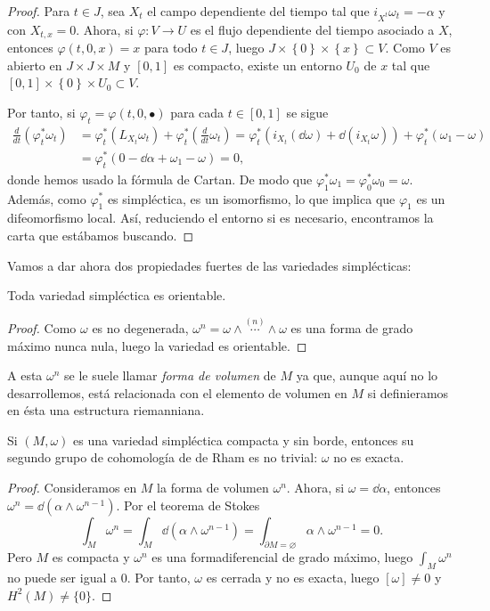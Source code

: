 \begin{proof}
  Para $t \in J$, sea $X_t$ el campo dependiente del tiempo tal que $i_{X^t}\omega_t= - \alpha$ y con $X_{t,x}=0$. Ahora, si $\varphi:V\rightarrow U$ es el flujo dependiente del tiempo asociado a $X$, entonces $\varphi(t,0,x)=x$ para todo $t\in J$, luego $J\times \left\{ 0 \right\}\times \left\{ x \right\} \subset V$. Como $V$ es abierto en $J\times J\times M$ y $[0,1]$ es compacto, existe un entorno $U_0$ de $x$  tal que $[0,1]\times \left\{ 0 \right\}\times U_0 \subset V$. 
  
  Por tanto, si $\varphi_t = \varphi(t,0,\bullet)$ para cada $t\in [0,1]$ se sigue
  \begin{align*}
    \frac{d}{dt}(\varphi_t^*\omega_t) & = \varphi_t^* (L_{X_t}\omega_t) + \varphi_t^* \left( \frac{d}{dt}\omega_t \right) = \varphi_t^* (i_{X_t}(\dd \omega)+\dd (i_{X_t}\omega))+\varphi_t^*(\omega_1-\omega) \\
    & = \varphi_t^*(0-\dd \alpha + \omega_1 - \omega) = 0,
  \end{align*}
  donde hemos usado la fórmula de Cartan. De modo que $\varphi_1^*\omega_1=\varphi_0^*\omega_0=\omega$. Además, como $\varphi_1^*$ es simpléctica, es un isomorfismo, lo que implica que $\varphi_1$ es un difeomorfismo local. Así, reduciendo el entorno si es necesario, encontramos la carta que estábamos buscando.
\end{proof}

Vamos a dar ahora dos propiedades fuertes de las variedades simplécticas:
\begin{prop}
  Toda variedad simpléctica es orientable.
\end{prop}
\begin{proof}
  Como $\omega$ es no degenerada, $\omega^n=\omega \wedge \overset{(n)}{\cdots} \wedge \omega$ es una forma de grado máximo nunca nula, luego la variedad es orientable.
\end{proof}

A esta $\omega^n$ se le suele llamar \emph{forma de volumen} de $M$ ya que, aunque aquí no lo desarrollemos, está relacionada con el elemento de volumen en $M$ si definieramos en ésta una estructura riemanniana.

\begin{prop}
  Si $(M,\omega)$ es una variedad simpléctica compacta y sin borde, entonces su segundo grupo de cohomología de de Rham es no trivial: $\omega$ no es exacta.
\end{prop}
\begin{proof}
  Consideramos en $M$ la forma de volumen $\omega^n$. Ahora, si $\omega=\dd \alpha$, entonces $\omega^n=\dd (\alpha \wedge \omega^{n-1})$. Por el teorema de Stokes
  \begin{equation*}
    \int_M \omega^n=\int_M \dd (\alpha \wedge \omega^{n-1}) = \int_{\partial M=\varnothing} \alpha \wedge \omega^{n-1}=0.
  \end{equation*}
  Pero $M$ es compacta y $\omega^n$ es una formadiferencial de grado máximo, luego $\int_M \omega^n$ no puede ser igual a $0$. Por tanto, $\omega$ es cerrada y no es exacta, luego $[\omega]\neq 0$ y $H^2(M) \neq \{0\}$.
\end{proof}

